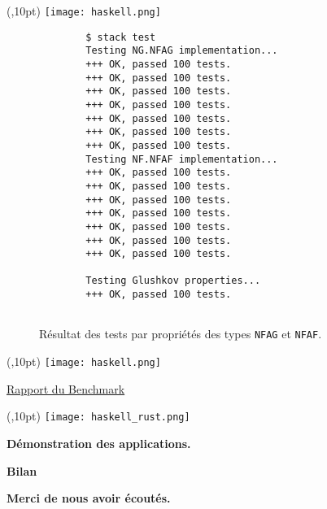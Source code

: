 \documentclass[aspectratio=169,xcolor=dvipsnames]{beamer}
\begin{document}

\begin{frame}[fragile]
    \begin{textblock*}{20pt}(\textwidth-50pt,10pt)
        \texttt{[image: haskell.png]}
    \end{textblock*}
    \begin{figure}
        \begin{verbatim}
        $ stack test
        Testing NG.NFAG implementation...
        +++ OK, passed 100 tests.
        +++ OK, passed 100 tests.
        +++ OK, passed 100 tests.
        +++ OK, passed 100 tests.
        +++ OK, passed 100 tests.
        +++ OK, passed 100 tests.
        +++ OK, passed 100 tests.
        Testing NF.NFAF implementation...
        +++ OK, passed 100 tests.
        +++ OK, passed 100 tests.
        +++ OK, passed 100 tests.
        +++ OK, passed 100 tests.
        +++ OK, passed 100 tests.
        +++ OK, passed 100 tests.
        +++ OK, passed 100 tests.
        
        Testing Glushkov properties...
        +++ OK, passed 100 tests.
        
      \end{verbatim}
        \caption{
            Résultat des tests par propriétés des types 
            \texttt{NFAG} et \texttt{NFAF}.
        }
    \end{figure}
\end{frame}


\begin{frame}[fragile]
    \begin{textblock*}{20pt}(\textwidth-50pt,10pt)
        \texttt{[image: haskell.png]}
    \end{textblock*}
    \begin{center}
        \href{run:report_perf.html}{Rapport du Benchmark}
    \end{center}
\end{frame}


\begin{frame}
    \begin{textblock*}{20pt}(\textwidth-130pt,10pt)
        \texttt{[image: haskell\_rust.png]}
    \end{textblock*}
    \Huge{\centerline{\textbf{Démonstration des applications.}}}
\end{frame}


\begin{frame}
    \Huge{\centerline{\textbf{Bilan}}}
\end{frame}


\begin{frame}
    \Huge{\centerline{\textbf{Merci de nous avoir écoutés.}}}
\end{frame}

\end{document}
